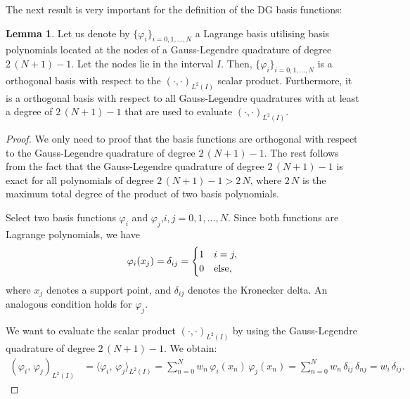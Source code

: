 \documentclass{scrreprt}
\theoremstyle{definition}
\newtheorem{lemma}[theorem]{Lemma}
\theoremstyle{nonumberplain}
\newtheorem{proof}{Proof}
\begin{document}
The next result is very important for the definition of the DG basis
functions:
\begin{lemma}
Let us denote by $\{\varphi_{i}\}_{i=0,1,\ldots,N}$ a Lagrange basis utilising
basis polynomials located at the nodes of a Gauss-Legendre quadrature of
degree $2\,(N+1)-1$. Let the nodes lie in the interval $I$.
Then, $\{\varphi_{i}\}_{i=0,1,\ldots,N}$ is a orthogonal
basis with respect to the $(\cdot,\cdot)_{L^2(I)}$ scalar product.
Furthermore, it is a orthogonal basis with respect to all
Gauss-Legendre quadratures with at least a degree
of $2\,(N+1)-1$ that are used to evaluate $(\cdot,\cdot)_{L^2(I)}$.
\end{lemma}
\begin{proof}
We only need to proof that the basis functions are orthogonal with
respect to the Gauss-Legendre quadrature of degree $2\,(N+1)-1$.
The rest follows from the fact that the Gauss-Legendre
quadrature of degree ${2\,(N+1)-1}$ is exact for all polynomials of degree
$2\,(N+1)-1 > 2\,N$, where $2\,N$ is the maximum total degree
of the product of two basis polynomials.

Select two basis functions $\varphi_{i}$ and
$\varphi_{j}$,$i,j=0,1,\ldots,N$.
Since both functions are Lagrange polynomials, we have
\begin{align}
\label{eq:preliminaries:lagrange_orthogonality}
\varphi_i (x_j) =
\delta_{ij} =
\begin{cases}
1 & i=j, \\
0 & \textup{else},
\end{cases}
\end{align}
where $x_j$ denotes a support point, and $\delta_{ij}$ denotes the
Kronecker delta.
An analogous condition holds for $\varphi_j$.

We want to evaluate the scalar product
$(\cdot,\cdot)_{L^2(I)}$ by using the Gauss-Legendre
quadrature of degree $2\,(N+1)-1$.
We obtain:
\begin{align*}
(\varphi_i,\,\varphi_j)_{L^2(I)}
&=
\langle\varphi_i,\,\varphi_j\rangle_{L^2(I)}
=
\sum_{n=0}^{N} w_n\,\varphi_{i}(x_n)\,\varphi_{j}(x_n) =
\sum_{n=0}^{N} w_n\,\delta_{ij}\,\delta_{nj} =
w_i\,\delta_{ij}.
\end{align*}
\end{proof}
\end{document}
